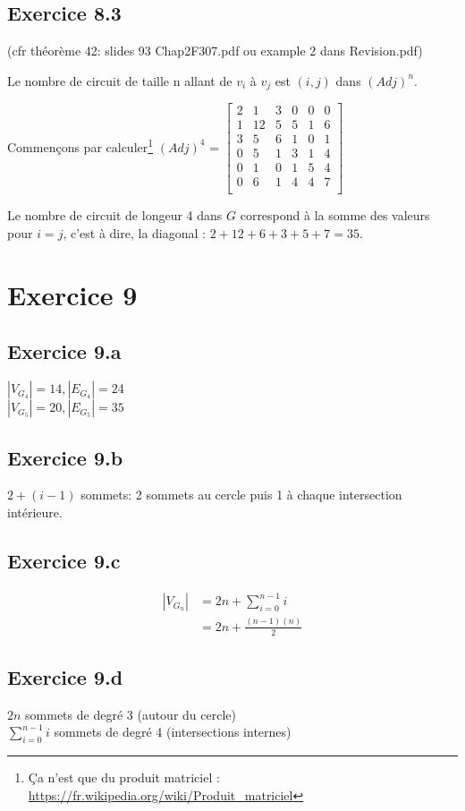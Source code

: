 \documentclass[fontsize=10pt]{article}
\begin{document}
\subsection*{Exercice 8.3}
(cfr théorème 42: slides 93 Chap2F307.pdf ou example 2 dans Revision.pdf)
\par Le nombre de circuit de taille n allant de $v_i$ à $v_j$ est $(i,j)$ dans
$(Adj)^n$.

Commençons par calculer\footnote{Ça n'est que du produit matriciel : \url{https://fr.wikipedia.org/wiki/Produit_matriciel}} $(Adj)^4$ = $\begin{bmatrix}
    2 &1 &3 &0 &0 &0 \\
    1 &12&5 &5 &1 &6 \\
    3 &5 &6 &1 &0 &1 \\
    0 &5 &1 &3 &1 &4 \\
    0 &1 &0 &1 &5 &4 \\
    0 &6 &1 &4 &4 &7 \\
\end{bmatrix}$

Le nombre de circuit de longeur 4 dans $G$ correspond à la somme des valeurs
pour $i = j$, c'est à dire, la diagonal : $2 + 12 + 6 + 3 + 5 + 7 = 35$.


\section*{Exercice 9}
\subsection*{Exercice 9.a}
$|V_{G_4}| = 14, |E_{G_4}| = 24$\\
$|V_{G_5}| = 20, |E_{G_5}| = 35$

\subsection*{Exercice 9.b}
$2+(i-1)$ sommets: 2 sommets au cercle puis 1 à chaque intersection intérieure.

\subsection*{Exercice 9.c}
\begin{align*}
    |V_{G_n}| &= 2n + \displaystyle\sum_{i=0}^{n-1} i\\
               &= 2n + \frac{(n-1)(n)}{2}
\end{align*}

\subsection*{Exercice 9.d}
$2n$ sommets de degré 3 (autour du cercle)\\
$\displaystyle\sum_{i=0}^{n-1} i$ sommets de degré 4 (intersections internes)\\
\end{document}
